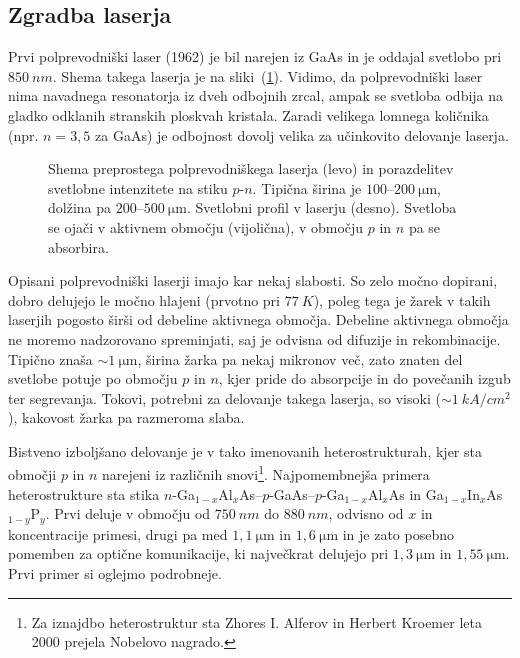 \subsection*{Zgradba laserja}
Prvi polprevodniški laser (1962) je bil narejen iz GaAs in je oddajal svetlobo 
pri $850~\si{nm}$. Shema takega laserja je na sliki~(\ref{fig:pnshema}).
Vidimo, da polprevodniški laser nima navadnega resonatorja iz dveh odbojnih zrcal,
ampak se svetloba odbija na gladko odklanih stranskih ploskvah kristala. Zaradi
velikega lomnega količnika (npr. $n=3,5$ za GaAs) je odbojnost dovolj velika
za učinkovito delovanje laserja.
 
\begin{figure}[h]
\centering
\def\svgwidth{130truemm} 

\caption{Shema preprostega polprevodniškega laserja (levo) in porazdelitev svetlobne
intenzitete na stiku $p$-$n$. Tipična širina je $100$--$200~\si{\micro\metre}$, 
dolžina pa $200$--$500~\si{\micro\metre}$. Svetlobni profil v laserju (desno). Svetloba 
se ojači v aktivnem območju (vijolična), v območju $p$ in $n$ pa se absorbira.
}
\label{fig:pnshema}
\end{figure}

Opisani polprevodniški laserji imajo kar nekaj slabosti. So zelo močno dopirani, 
dobro delujejo le močno hlajeni (prvotno pri $77~\si{K}$), poleg tega je žarek 
v takih laserjih pogosto širši od debeline aktivnega območja. Debeline
aktivnega območja ne moremo nadzorovano spreminjati, saj je odvisna od difuzije in rekombinacije. 
Tipično znaša $\sim 1~\si{\micro\meter}$, širina žarka pa nekaj mikronov več, zato
znaten del svetlobe potuje po območju $p$ in $n$, kjer pride do 
absorpcije in do povečanih izgub ter segrevanja. Tokovi, potrebni za 
delovanje takega laserja, so visoki ($\sim 1~\si{kA}/\si{cm}^2$), 
kakovost žarka pa razmeroma slaba. 

Bistveno izboljšano delovanje je v tako imenovanih heterostrukturah, kjer sta območji 
$p$ in $n$ narejeni iz različnih snovi\footnote{Za iznajdbo heterostruktur sta Zhores I. Alferov 
in Herbert Kroemer leta 2000 prejela Nobelovo nagrado.}. Najpomembnejša primera heterostrukture
sta stika $n$-Ga$_{1-x}$Al$_x$As--$p$-GaAs--$p$-Ga$_{1-x}$Al$_x$As in 
Ga$_{1-x}$In$_{x}$As$_{1-y}$P$_y$. Prvi deluje v območju od $750~\si{nm}$ do $880~\si{nm}$, 
odvisno od $x$ in koncentracije primesi, drugi pa med $1,1~\si{\micro\metre}$ in 
$1,6~\si{\micro\metre}$ in je zato posebno pomemben za optične
komunikacije, ki največkrat delujejo pri $1,3~\si{\micro\meter}$ in $1,55~\si{\micro\meter}$. 
Prvi primer si oglejmo podrobneje.


